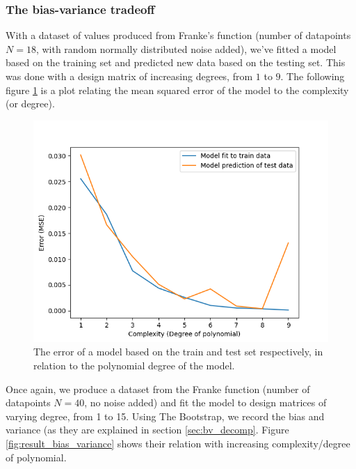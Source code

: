 \documentclass[../main.tex]{subfiles}
\begin{document}
\subsubsection{The bias-variance tradeoff}
With a dataset of values produced from Franke's function (number of datapoints $N=18$, with random normally distributed noise added), we've fitted a model based on the training set and predicted new data based on the testing set. This was done with a design matrix of increasing degrees, from $1$ to $9$. The following figure \ref{fig:result_complexity} is a plot relating the mean squared error of the model to the complexity (or degree).

\begin{figure}[h]
    \centering
    \includegraphics[width=\textwidth]{../assets/complexity.png}
    \caption{The error of a model based on the train and test set respectively, in relation to the polynomial degree of the model.}
    \label{fig:result_complexity}
\end{figure}

Once again, we produce a dataset from the Franke function (number of datapoints $N=40$, no noise added) and fit the model to design matrices of varying degree, from 1 to 15. Using The Bootstrap, we record the bias and variance (as they are explained in section \ref{sec:bv_decomp}. Figure \ref{fig:result_bias_variance} shows their relation with increasing complexity/degree of polynomial. 
\end{document}
